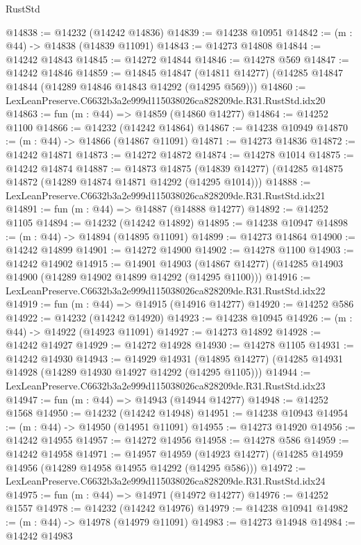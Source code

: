 \begin{lexlean}{RustStd}
\begin{coremodule}
@14838 := @14232 (@14242 @14836)
@14839 := @14238 @10951
@14842 := (m : @44) -> @14838 (@14839 @11091)
@14843 := @14273 @14808
@14844 := @14242 @14843
@14845 := @14272 @14844
@14846 := @14278 @569
@14847 := @14242 @14846
@14859 := @14845
    @14847
    (@14811 @14277)
    (@14285 @14847 @14844 (@14289 @14846 @14843 @14292 (@14295 @569)))
@14860 := LexLeanPreserve.C6632b3a2e999d115038026ca828209de.R31.RustStd.idx20
@14863 := fun (m : @44) => @14859 (@14860 @14277)
@14864 := @14252 @1100
@14866 := @14232 (@14242 @14864)
@14867 := @14238 @10949
@14870 := (m : @44) -> @14866 (@14867 @11091)
@14871 := @14273 @14836
@14872 := @14242 @14871
@14873 := @14272 @14872
@14874 := @14278 @1014
@14875 := @14242 @14874
@14887 := @14873
    @14875
    (@14839 @14277)
    (@14285 @14875 @14872 (@14289 @14874 @14871 @14292 (@14295 @1014)))
@14888 := LexLeanPreserve.C6632b3a2e999d115038026ca828209de.R31.RustStd.idx21
@14891 := fun (m : @44) => @14887 (@14888 @14277)
@14892 := @14252 @1105
@14894 := @14232 (@14242 @14892)
@14895 := @14238 @10947
@14898 := (m : @44) -> @14894 (@14895 @11091)
@14899 := @14273 @14864
@14900 := @14242 @14899
@14901 := @14272 @14900
@14902 := @14278 @1100
@14903 := @14242 @14902
@14915 := @14901
    @14903
    (@14867 @14277)
    (@14285 @14903 @14900 (@14289 @14902 @14899 @14292 (@14295 @1100)))
@14916 := LexLeanPreserve.C6632b3a2e999d115038026ca828209de.R31.RustStd.idx22
@14919 := fun (m : @44) => @14915 (@14916 @14277)
@14920 := @14252 @586
@14922 := @14232 (@14242 @14920)
@14923 := @14238 @10945
@14926 := (m : @44) -> @14922 (@14923 @11091)
@14927 := @14273 @14892
@14928 := @14242 @14927
@14929 := @14272 @14928
@14930 := @14278 @1105
@14931 := @14242 @14930
@14943 := @14929
    @14931
    (@14895 @14277)
    (@14285 @14931 @14928 (@14289 @14930 @14927 @14292 (@14295 @1105)))
@14944 := LexLeanPreserve.C6632b3a2e999d115038026ca828209de.R31.RustStd.idx23
@14947 := fun (m : @44) => @14943 (@14944 @14277)
@14948 := @14252 @1568
@14950 := @14232 (@14242 @14948)
@14951 := @14238 @10943
@14954 := (m : @44) -> @14950 (@14951 @11091)
@14955 := @14273 @14920
@14956 := @14242 @14955
@14957 := @14272 @14956
@14958 := @14278 @586
@14959 := @14242 @14958
@14971 := @14957
    @14959
    (@14923 @14277)
    (@14285 @14959 @14956 (@14289 @14958 @14955 @14292 (@14295 @586)))
@14972 := LexLeanPreserve.C6632b3a2e999d115038026ca828209de.R31.RustStd.idx24
@14975 := fun (m : @44) => @14971 (@14972 @14277)
@14976 := @14252 @1557
@14978 := @14232 (@14242 @14976)
@14979 := @14238 @10941
@14982 := (m : @44) -> @14978 (@14979 @11091)
@14983 := @14273 @14948
@14984 := @14242 @14983

\end{coremodule}
\end{lexlean}

